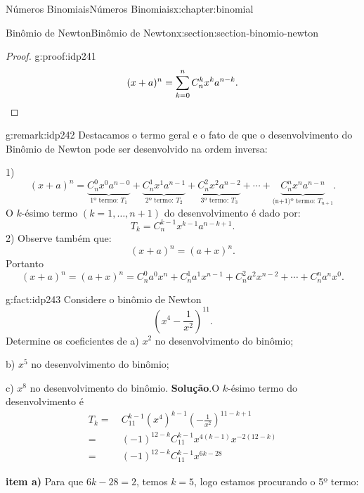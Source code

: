 \documentclass[oneside,10pt,]{book}
\newcommand{\blocktitlefont}{\relax}
\newcommand{\terminology}[1]{\textbf{#1}}
\newcommand{\qedhere}{\relax}
\numberwithin{equation}{section}
\newcommand{\amp}{&}
\begin{document}
\begin{chapterptx}{Números Binomiais}{}{Números Binomiais}{}{}{x:chapter:binomial}
\begin{sectionptx}{Binômio de Newton}{}{Binômio de Newton}{}{}{x:section:section-binomio-newton}
\begin{proof}{}{g:proof:idp241}
\begin{equation*}
(x+a)^n  = \sum_{k=0}^n C_n^k x^ka^{n-k}.\qedhere
\end{equation*}
%
\end{proof}
\begin{remark}{}{g:remark:idp242}%
Destacamos o termo geral e o fato de que o desenvolvimento do Binômio de Newton pode ser desenvolvido na ordem inversa:%
\par
1)%
\begin{equation*}
(x+a)^n   = \underbrace{C_n^0x^0a^{n-0}}_{\text{1º termo: } T_1} + \underbrace{C_n^1x^1a^{n-1}}_{\text{2º termo: } T_2} + \underbrace{C_n^2x^2a^{n-2}}_{\text{3º termo: } T_3} + \cdots + \underbrace{C_n^nx^na^{n-n}}_{\text{(n+1)º termo: } T_{n+1}}.
\end{equation*}
O \(k\)-ésimo termo \((k=1, \ldots, n+1)\) do desenvolvimento é dado por:%
\begin{equation*}
T_{k} = C_n^{k-1}x^{k-1}a^{n-k+1}. 
\end{equation*}
2) Observe também que:%
\begin{equation*}
(x+a)^n = (a+x)^n.
\end{equation*}
Portanto%
\begin{equation*}
(x+a)^n = (a+x)^n =  C_n^0a^0x^n+C_n^1a^1x^{n-1}+ C_n^2a^2x^{n-2}+\cdots + C_n^na^nx^0.
\end{equation*}
%
\end{remark}
\begin{fact}{}{}{g:fact:idp243}%
Considere o binômio de Newton%
\begin{equation*}
\left(x^4-\frac{1}{x^2}\right)^{11}.
\end{equation*}
Determine os coeficientes de a) \(x^2\) no desenvolvimento do binômio;%
 \par
b) \(x^5\) no desenvolvimento do binômio;%
 \par
c) \(x^8\) no desenvolvimento do binômio.%
%
\textbf{\blocktitlefont Solução}.\quad{}O \(k\)-ésimo termo do desenvolvimento é%
\begin{align*}
T_k = \amp ~ C_{11}^{k-1}(x^4)^{k-1}\left(-\frac{1}{x^2}\right)^{11-k+1}  \\
= \amp ~ (-1)^{12-k}C_{11}^{k-1}x^{4(k-1)}x^{-2(12-k)}  \\
= \amp ~ (-1)^{12-k}C_{11}^{k-1}x^{6k-28}  
\end{align*}
%
\par
\terminology{item a)} Para que \(6k-28 = 2\), temos \(k=5\), logo estamos procurando o 5º termo:%
\begin{equation*}

\end{equation*}
\end{fact}
\end{sectionptx}
\end{chapterptx}
\end{document}

